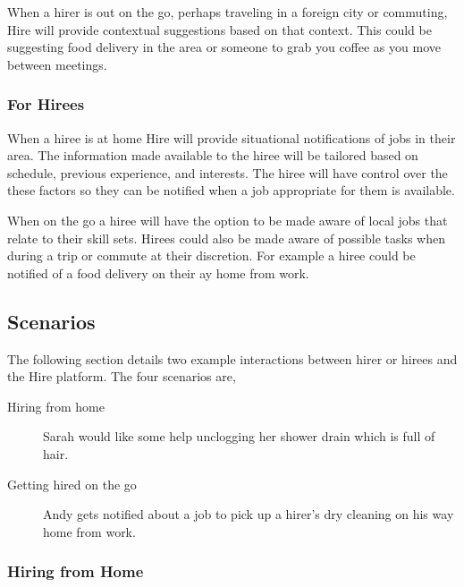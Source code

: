 \documentclass[11pt]{article}
\begin{document}
When a hirer is out on the go, perhaps traveling in a foreign city or commuting, Hire will provide contextual suggestions based on that context. This could be suggesting food delivery in the area or someone to grab you coffee as you move between meetings.

\subsubsection{For Hirees}

When a hiree is at home Hire will provide situational notifications of jobs in their area. The information made available to the hiree will be tailored based on schedule, previous experience, and interests. The hiree will have control over the these factors so they can be notified when a job appropriate for them is available.

When on the go a hiree will have the option to be made aware of local jobs that relate to their skill sets. Hirees could also be made aware of possible tasks when during a trip or commute at their discretion. For example a hiree could be notified of a food delivery on their ay home from work.

\subsection{Scenarios}

The following section details two example interactions between hirer or hirees and the Hire platform. The four scenarios are,

\begin{description}
    \item[Hiring from home] Sarah would like some help unclogging her shower drain which is full of hair.
    \item[Getting hired on the go] Andy gets notified about a job to pick up a hirer's dry cleaning on his way home from work.
\end{description}

\subsubsection{Hiring from Home}
\end{document}
